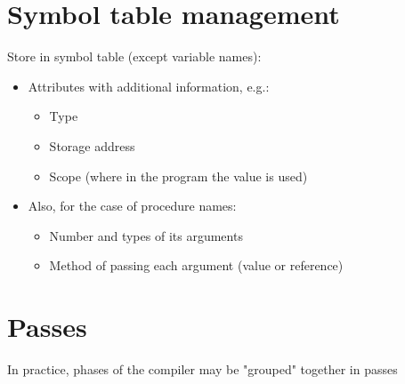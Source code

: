 \documentclass{article}[18pt]
\begin{document}
\section{Symbol table management}
Store in symbol table (except variable names):
\begin{itemize}
	\item Attributes with additional information, e.g.:
	\begin{itemize}
		\item Type
		\item Storage address
		\item Scope (where in the program the value is used)
	\end{itemize}
	\item Also, for the case of procedure names:
	\begin{itemize}
		\item Number and types of its arguments
		\item Method of passing each argument (value or reference)
	\end{itemize}
\end{itemize} 
\section{Passes}
In practice, phases of the compiler may be "grouped" together in passes
\end{document}
